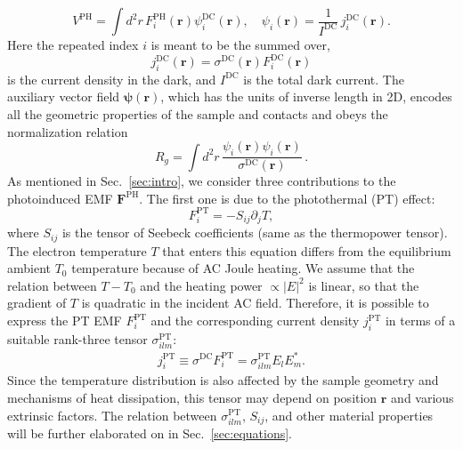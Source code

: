 \documentclass[aps, prb, reprint, superscriptaddress]{revtex4-2}
\renewcommand{\vec}{\mathbf}
\begin{document}
\begin{equation}
	V^{\mathrm{PH}} = \int d^2 r \, F_i^{\mathrm{PH}}(\vec{r}) \psi_i^\mathrm{DC}(\vec{r}),
	 \quad
	\psi_i(\vec{r}) = \frac{1}{I^\mathrm{DC}}\, j_i^\mathrm{DC}(\vec{r}). 
\label{eqn:shockley-ramo}  
\end{equation}
Here the repeated index $i$ is meant to be the summed over,
\begin{equation}
 j_i^\mathrm{DC}(\vec{r}) = \sigma^\mathrm{DC}(\vec{r})
 F_i^\mathrm{DC}(\vec{r})
 \label{eqn:j_DC}  
\end{equation}
is the current density in the dark,
and $I^\mathrm{DC}$ is the total dark current.
The auxiliary vector field $\vec{\psi}(\vec{r})$,
which has the units of inverse length in 2D,
encodes all the geometric properties of the sample and contacts and obeys
the normalization relation
\begin{equation}
	R_g = \int d^2 r \, \frac{\psi_i(\vec{r}) \psi_i(\vec{r})}{\sigma^\mathrm{DC}(\vec{r})} \,.
	\label{eqn:R_shockley-ramo}  
\end{equation}
As mentioned in Sec.~\ref{sec:intro}, we consider three contributions to the photoinduced EMF $\vec{F}^{\mathrm{PH}}$.
The first one is due to the photothermal (PT) effect:
\begin{equation}
	F_i^{\mathrm{PT}} = - S_{i j} \partial_j T, 
	\label{eqn:jPT}
\end{equation}
where $S_{i j}$ is the tensor of Seebeck coefficients (same as the thermopower tensor).
The electron temperature $T$ that enters this equation differs from the equilibrium ambient $T_0$ temperature
because of AC Joule heating.
We assume that the relation between $T - T_0$ and the heating power $\propto |E|^2$ is linear,
so that the gradient of $T$ is quadratic in the incident AC field.
Therefore, it is possible to express the PT EMF $F_i^\mathrm{PT}$ and the corresponding current density $j_i^\mathrm{PT}$ in terms of a suitable rank-three tensor $\sigma^\mathrm{PT}_{ilm}$:
\begin{align}
j_i^\mathrm{PT} \equiv \sigma^{\mathrm{DC}}	F_i^\mathrm{PT} = \sigma^\mathrm{PT}_{ilm} E_{l} E^*_{m}.
	\label{eqn:jPT_sigmaPT}
\end{align}
Since the temperature distribution is also affected by the sample geometry and
mechanisms of heat dissipation,
this tensor may depend on position $\vec{r}$ and various extrinsic factors.
The relation between $\sigma^\mathrm{PT}_{ilm}$, $S_{i j}$, and other
material properties will be further elaborated on in Sec.~\ref{sec:equations}.
\end{document}
